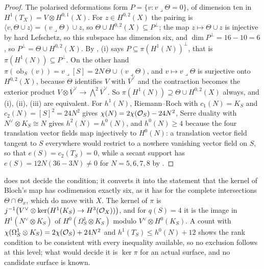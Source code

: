 \begin{proof}
The polarised deformations form $P=\{v:v\lrcorner\Theta=0\}$, of dimension
ten in $H^{1}(T_{X})=V\otimes H^{0,1}(X)$. For $z\in H^{0,2}(X)$ the pairing
is $\langle v,\Theta\cup z\rangle=(v\lrcorner\Theta)\cup z$, so
$\Theta\cup H^{0,2}(X)\subseteq P^{\perp}$; the map $z\mapsto\Theta\cup z$ is
injective by hard Lefschetz, so this subspace has dimension six, and
$\dim P^{\perp}=16-10=6$, so $P^{\perp}=\Theta\cup H^{0,2}(X)$. By
, (i) says $P\subseteq\pi(H^{1}(N))^{\perp}$, that is
$\pi(H^{1}(N))\subseteq P^{\perp}$. On the other hand
$\pi(\operatorname{ob}_{S}(v))=v\lrcorner[S]=2N\,\Theta\cup(v\lrcorner\Theta)$,
and $v\mapsto v\lrcorner\Theta$ is surjective onto $H^{0,2}(X)$, because
$\Theta$ identifies $V$ with $\overline{V}^{\vee}$ and the contraction becomes
the exterior product $V\otimes\overline{V}^{\vee}\to\bigwedge^{2}\overline{V}^{\vee}$.
So $\pi(H^{1}(N))\supseteq\Theta\cup H^{0,2}(X)$ always, and (i), (ii), (iii)
are equivalent. For $h^{1}(N)$, Riemann--Roch with $c_{1}(N)=K_{S}$ and
$c_{2}(N)=[S]^{2}=24N^{2}$ gives $\chi(N)=2\chi(\mathcal{O}_{S})-24N^{2}$, Serre
duality with $N^{\vee}\otimes K_{S}\cong N$ gives $h^{2}(N)=h^{0}(N)$, and
$h^{0}(N)\ge4$ because the four translation vector fields map injectively to
$H^{0}(N)$: a translation vector field tangent to $S$ everywhere would restrict
to a nowhere vanishing vector field on $S$, so that $e(S)=c_{2}(T_{S})=0$,
while a secant support has $e(S)=12N(36-3N)\ne0$ for $N=5,6,7,8$ by
.
\end{proof}

\begin{remark}\label{rem:smoothrank}
 does not decide the condition; it converts it into the
statement that the kernel of Bloch's map has codimension exactly six, as it
has for the complete intersections $\Theta\cap\Theta_{x}$, which do move with
$X$. The kernel of $\pi$ is
$j^{-1}\bigl(V^{\vee}\otimes\ker(H^{1}(K_{S})\to H^{3}(\mathcal{O}_{X}))\bigr)$, and
for $q(S)=4$ it is the image in $H^{1}(N^{\vee}\otimes K_{S})$ of
$H^{0}(\Omega^{1}_{S}\otimes K_{S})$ modulo $V^{\vee}\otimes H^{0}(K_{S})$. A
count with $\chi(\Omega^{1}_{S}\otimes K_{S})=2\chi(\mathcal{O}_{S})+24N^{2}$ and
$h^{1}(T_{S})\le h^{0}(N)+12$ shows the rank condition to be consistent with
every inequality available, so no exclusion follows at this level; what
would decide it is $\ker\pi$ for an actual surface, and no candidate surface
is known.
\end{remark}


